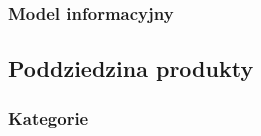 \subsubsection{Model informacyjny}\label{subsubsec:database:gateway:domainModel}


\subsection{Poddziedzina produkty}\label{subsec:database:products}

\subsubsection{Kategorie}\label{subsubsec:database:products:categories}
